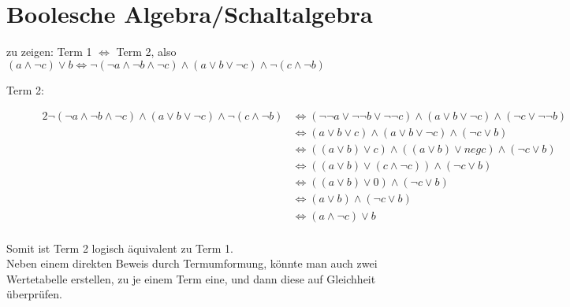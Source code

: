 \documentclass{gadsescript}
\begin{document}
\section{Boolesche Algebra/Schaltalgebra}
zu zeigen: Term 1 $ \iff $ Term 2, also $ ( a \wedge \neg c ) \vee b \iff \neg ( \neg a \wedge \neg b \wedge \neg c ) \wedge ( a \vee b \vee \neg c ) \wedge \neg ( c \wedge \neg b ) $
\begin{description}
	\item[Term 2:]
		\begin{alignat*}{2}
			\neg ( \neg a \wedge \neg b \wedge \neg c ) \wedge ( a \vee b \vee \neg c ) \wedge \neg ( c \wedge \neg b ) & \iff (\neg \neg a \vee \neg\neg b \vee \neg\neg c) \wedge ( a \vee b \vee \neg c ) \wedge (\neg c \vee \neg \neg b )\\
			~&\iff ( a \vee b \vee c ) \wedge ( a \vee b \vee \neg c ) \wedge ( \neg c \vee b )\\
			~&\iff ( ( a \vee b ) \vee c ) \wedge ( ( a \vee b ) \vee neg c ) \wedge ( \neg c \vee b )\\
			~&\iff ( ( a \vee b ) \vee ( c \wedge \neg c ) )  \wedge ( \neg c \vee b )\\
			~&\iff ( ( a \vee b ) \vee 0 ) \wedge ( \neg c \vee b )\\
			~&\iff ( a \vee b ) \wedge ( \neg c \vee b )\\
			~&\iff ( a \wedge \neg c ) \vee b\\
		\end{alignat*}
\end{description}
Somit ist Term 2 logisch äquivalent zu Term 1.\\
Neben einem direkten Beweis durch Termumformung, könnte man auch zwei Wertetabelle erstellen, zu je einem Term eine, und dann diese auf Gleichheit überprüfen.
\end{document}
